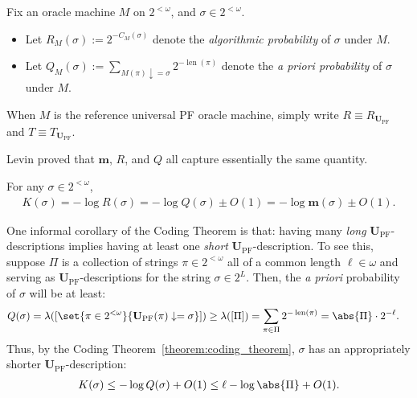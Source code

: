 \begin{definition}
    Fix an oracle machine $M$ on $2^{<\omega}$, and $\sigma \in 2^{<\omega}$. 
    \begin{itemize}
        \item Let $R_M(\sigma) := 2^{-C_M(\sigma)}$ denote the \textit{algorithmic probability} of $\sigma$ under $M$.
        \item Let $Q_M(\sigma) := \sum_{M(\pi) \downarrow = \sigma} 2^{- \operatorname{len}(\pi)}$ denote the \textit{a priori probability} of $\sigma$ under $M$.
    \end{itemize}
    When $M$ is the reference universal PF oracle machine, simply write $R \equiv R_{\mathbf{U}_{\operatorname{PF}}}$ and $T \equiv T_{\mathbf{U}_{\operatorname{PF}}}$. 
\end{definition}

Levin proved that $\mathbf{m}$, $R$, and $Q$ all capture essentially the same quantity.

\begin{theorem}
    \label{theorem:coding_theorem}
    For any $\sigma \in 2^{<\omega}$,
    \begin{align*}
        K(\sigma) = -\log R(\sigma) = -\log Q(\sigma) \pm O(1) = -\log \mathbf{m}(\sigma) \pm O(1).
    \end{align*} 
\end{theorem}

One informal corollary of the Coding Theorem is that: having many \textit{long} $\mathbf{U}_{\operatorname{PF}}$-descriptions implies having at least one \textit{short} $\mathbf{U}_{\operatorname{PF}}$-description. To see this, suppose $\Pi$ is a collection of strings $\pi \in 2^{<\omega}$ all of a common length $\ell \in \omega$ and serving as $\mathbf{U}_{\operatorname{PF}}$-descriptions for the string $\sigma \in 2^L$. Then, the \textit{a priori} probability of $\sigma$ will be at least:
\begin{align*}
    Q(\sigma) &= \lambda([\set{\pi \in 2^{< \omega}}{\mathbf{U}_{\operatorname{PF}}(\pi) \downarrow = \sigma}]) \geq \lambda([\Pi]) = \sum_{\pi \in \Pi} 2^{-\operatorname{len}(\pi)} = \abs{\Pi} \cdot 2^{-\ell}. 
\end{align*}
Thus, by the Coding Theorem~\ref{theorem:coding_theorem}, $\sigma$ has an appropriately shorter $\mathbf{U}_{\operatorname{PF}}$-description:
\begin{align*}
    K(\sigma) \leq - \log Q(\sigma) + O(1) \leq \ell - \log \abs{\Pi} + O(1). 
\end{align*}

